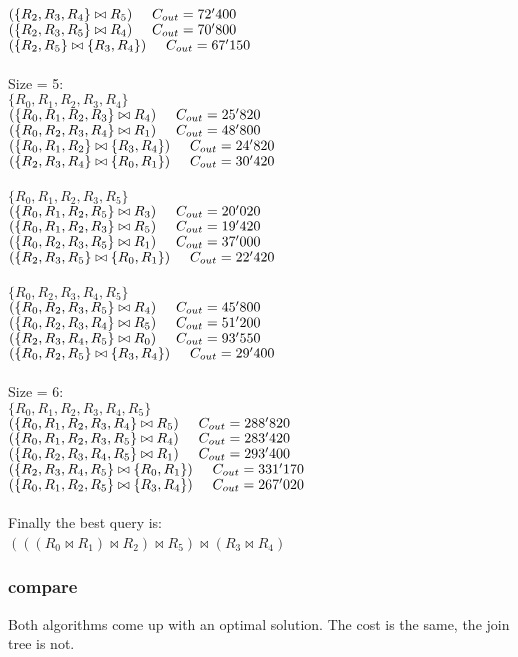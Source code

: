 \documentclass[11pt, a4]{article}
\newcommand\tab[1][0.5cm]{\hspace*{#1}}
\begin{document}
\tab \sout{$(\{R_2, R_3, R_4\} \bowtie R_5) \tab C_{out} = 72'400$}\\
\tab \sout{$(\{R_2, R_3, R_5\} \bowtie R_4) \tab C_{out} = 70'800$}\\
\tab $(\{R_2, R_5\} \bowtie \{R_3, R_4\}) \tab C_{out} = 67'150$\\
\\
Size = 5:\\
$\{R_0, R_1, R_2, R_3, R_4\}$\\
\tab \sout{$(\{R_0, R_1, R_2, R_3\} \bowtie R_4) \tab C_{out} = 25'820$}\\
\tab \sout{$(\{R_0, R_2, R_3, R_4\} \bowtie R_1) \tab C_{out} = 48'800$}\\
\tab $(\{R_0, R_1, R_2\} \bowtie \{R_3, R_4\}) \tab C_{out} = 24'820$\\
\tab \sout{$(\{R_2, R_3, R_4\} \bowtie \{R_0, R_1\}) \tab C_{out} = 30'420$}\\
\\
$\{R_0, R_1, R_2, R_3, R_5\}$\\
\tab \sout{$(\{R_0, R_1, R_2, R_5\} \bowtie R_3) \tab C_{out} = 20'020$}\\
\tab $(\{R_0, R_1, R_2, R_3\} \bowtie R_5) \tab C_{out} = 19'420$\\
\tab \sout{$(\{R_0, R_2, R_3, R_5\} \bowtie R_1) \tab C_{out} = 37'000$}\\
\tab \sout{$(\{R_2, R_3, R_5\} \bowtie \{R_0, R_1\}) \tab C_{out} = 22'420$}\\
\\
$\{R_0, R_2, R_3, R_4, R_5\}$\\
\tab \sout{$(\{R_0, R_2, R_3, R_5\} \bowtie R_4) \tab C_{out} = 45'800$}\\
\tab \sout{$(\{R_0, R_2, R_3, R_4\} \bowtie R_5) \tab C_{out} = 51'200$}\\
\tab \sout{$(\{R_2, R_3, R_4, R_5\} \bowtie R_0) \tab C_{out} = 93'550$}\\
\tab $(\{R_0, R_2, R_5\} \bowtie \{R_3, R_4\}) \tab C_{out} = 29'400$\\
\\
Size = 6:\\
$\{R_0, R_1, R_2, R_3, R_4, R_5\}$\\
\tab \sout{$(\{R_0, R_1, R_2, R_3, R_4\} \bowtie R_5) \tab C_{out} = 288'820$}\\
\tab \sout{$(\{R_0, R_1, R_2, R_3, R_5\} \bowtie R_4) \tab C_{out} = 283'420$}\\
\tab \sout{$(\{R_0, R_2, R_3, R_4, R_5\} \bowtie R_1) \tab C_{out} = 293'400$}\\
\tab \sout{$(\{R_2, R_3, R_4, R_5\} \bowtie \{R_0, R_1\}) \tab C_{out} = 331'170$}\\
\tab $(\{R_0, R_1, R_2, R_5\} \bowtie \{R_3, R_4\}) \tab C_{out} = 267'020$\\
\\
Finally the best query is:\\
$(((R_0 \bowtie R_1) \bowtie R_2) \bowtie R_5) \bowtie (R_3 \bowtie R_4)$\


\subsubsection{compare}
Both algorithms come up with an optimal solution. The cost is the same, the join tree is not.
\end{document}
